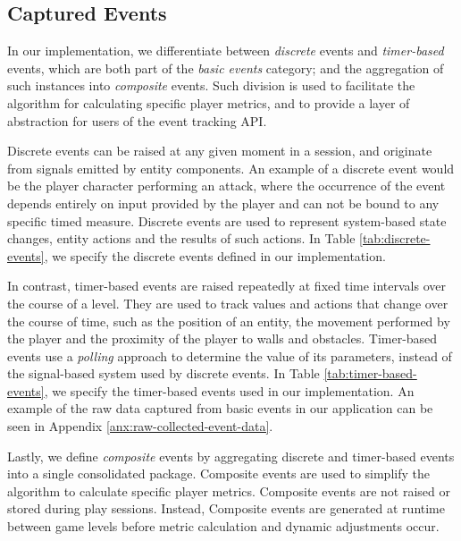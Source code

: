 \subsection{Captured Events}

In our implementation, we differentiate between \emph{discrete} events and \emph{timer-based} events, which are both part of the \emph{basic events} category; and the aggregation of such instances into \emph{composite} events. Such division is used to facilitate the algorithm for calculating specific player metrics, and to provide a layer of abstraction for users of the event tracking API.


Discrete events can be raised at any given moment in a session, and originate from signals emitted by entity components. An example of a discrete event would be the player character performing an attack, where the occurrence of the event depends entirely on input provided by the player and can not be bound to any specific timed measure. Discrete events are used to represent system-based state changes, entity actions and the results of such actions. In Table \ref{tab:discrete-events}, we specify the discrete events defined in our implementation.



In contrast, timer-based events are raised repeatedly at fixed time intervals over the course of a level. They are used to track values and actions that change over the course of time, such as the position of an entity, the movement performed by the player and the proximity of the player to walls and obstacles. Timer-based events use a \emph{polling} approach to determine the value of its parameters, instead of the signal-based system used by discrete events. In Table \ref{tab:timer-based-events}, we specify the timer-based events used in our implementation. An example of the raw data captured from basic events in our application can be seen in Appendix \ref{anx:raw-collected-event-data}.



Lastly, we define \emph{composite} events by aggregating discrete and timer-based events into a single consolidated package. Composite events are used to simplify the algorithm to calculate specific player metrics. Composite events are not raised or stored during play sessions. Instead, Composite events are generated at runtime between game levels before metric calculation and dynamic adjustments occur.


